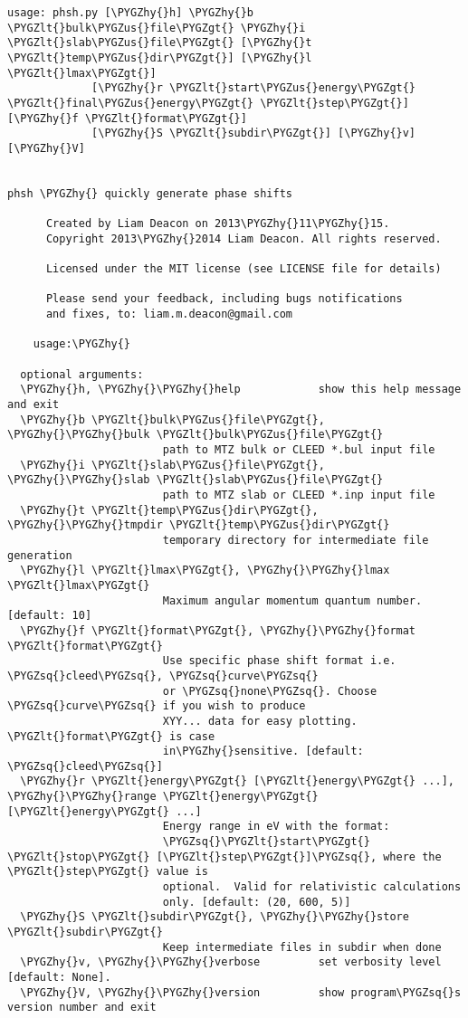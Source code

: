 \documentclass[letterpaper,10pt,english]{sphinxmanual}
\def\PYGZus{\char`\_}
\def\PYGZlt{\char`\<}
\def\PYGZgt{\char`\>}
\def\PYGZhy{\char`\-}
\def\PYGZsq{\char`\'}
\begin{document}
\begin{Verbatim}[commandchars=\\\{\}]
usage: phsh.py [\PYGZhy{}h] \PYGZhy{}b \PYGZlt{}bulk\PYGZus{}file\PYGZgt{} \PYGZhy{}i \PYGZlt{}slab\PYGZus{}file\PYGZgt{} [\PYGZhy{}t \PYGZlt{}temp\PYGZus{}dir\PYGZgt{}] [\PYGZhy{}l \PYGZlt{}lmax\PYGZgt{}]
             [\PYGZhy{}r \PYGZlt{}start\PYGZus{}energy\PYGZgt{} \PYGZlt{}final\PYGZus{}energy\PYGZgt{} \PYGZlt{}step\PYGZgt{}] [\PYGZhy{}f \PYGZlt{}format\PYGZgt{}]
             [\PYGZhy{}S \PYGZlt{}subdir\PYGZgt{}] [\PYGZhy{}v] [\PYGZhy{}V]


phsh \PYGZhy{} quickly generate phase shifts

      Created by Liam Deacon on 2013\PYGZhy{}11\PYGZhy{}15.
      Copyright 2013\PYGZhy{}2014 Liam Deacon. All rights reserved.

      Licensed under the MIT license (see LICENSE file for details)

      Please send your feedback, including bugs notifications
      and fixes, to: liam.m.deacon@gmail.com

    usage:\PYGZhy{}

  optional arguments:
  \PYGZhy{}h, \PYGZhy{}\PYGZhy{}help            show this help message and exit
  \PYGZhy{}b \PYGZlt{}bulk\PYGZus{}file\PYGZgt{}, \PYGZhy{}\PYGZhy{}bulk \PYGZlt{}bulk\PYGZus{}file\PYGZgt{}
                        path to MTZ bulk or CLEED *.bul input file
  \PYGZhy{}i \PYGZlt{}slab\PYGZus{}file\PYGZgt{}, \PYGZhy{}\PYGZhy{}slab \PYGZlt{}slab\PYGZus{}file\PYGZgt{}
                        path to MTZ slab or CLEED *.inp input file
  \PYGZhy{}t \PYGZlt{}temp\PYGZus{}dir\PYGZgt{}, \PYGZhy{}\PYGZhy{}tmpdir \PYGZlt{}temp\PYGZus{}dir\PYGZgt{}
                        temporary directory for intermediate file generation
  \PYGZhy{}l \PYGZlt{}lmax\PYGZgt{}, \PYGZhy{}\PYGZhy{}lmax \PYGZlt{}lmax\PYGZgt{}
                        Maximum angular momentum quantum number. [default: 10]
  \PYGZhy{}f \PYGZlt{}format\PYGZgt{}, \PYGZhy{}\PYGZhy{}format \PYGZlt{}format\PYGZgt{}
                        Use specific phase shift format i.e. \PYGZsq{}cleed\PYGZsq{}, \PYGZsq{}curve\PYGZsq{}
                        or \PYGZsq{}none\PYGZsq{}. Choose \PYGZsq{}curve\PYGZsq{} if you wish to produce
                        XYY... data for easy plotting. \PYGZlt{}format\PYGZgt{} is case
                        in\PYGZhy{}sensitive. [default: \PYGZsq{}cleed\PYGZsq{}]
  \PYGZhy{}r \PYGZlt{}energy\PYGZgt{} [\PYGZlt{}energy\PYGZgt{} ...], \PYGZhy{}\PYGZhy{}range \PYGZlt{}energy\PYGZgt{} [\PYGZlt{}energy\PYGZgt{} ...]
                        Energy range in eV with the format:
                        \PYGZsq{}\PYGZlt{}start\PYGZgt{} \PYGZlt{}stop\PYGZgt{} [\PYGZlt{}step\PYGZgt{}]\PYGZsq{}, where the \PYGZlt{}step\PYGZgt{} value is
                        optional.  Valid for relativistic calculations
                        only. [default: (20, 600, 5)]
  \PYGZhy{}S \PYGZlt{}subdir\PYGZgt{}, \PYGZhy{}\PYGZhy{}store \PYGZlt{}subdir\PYGZgt{}
                        Keep intermediate files in subdir when done
  \PYGZhy{}v, \PYGZhy{}\PYGZhy{}verbose         set verbosity level [default: None].
  \PYGZhy{}V, \PYGZhy{}\PYGZhy{}version         show program\PYGZsq{}s version number and exit
\end{Verbatim}
\end{document}
